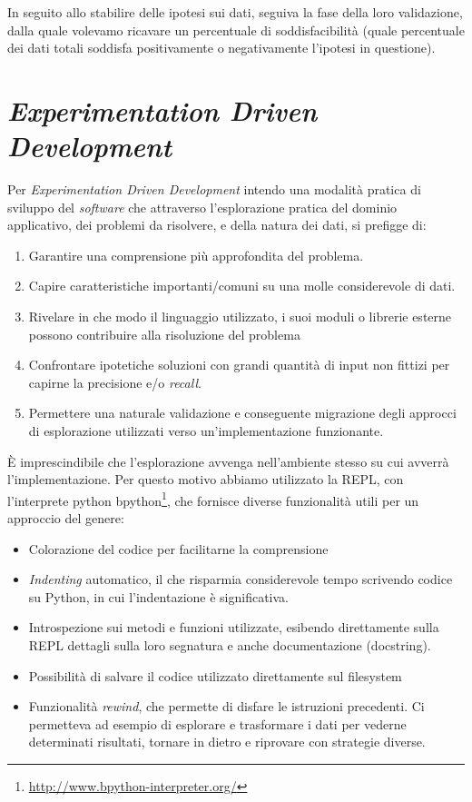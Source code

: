 \documentclass[12pt]{report}
\begin{document}
In seguito allo stabilire delle ipotesi sui dati, seguiva la fase della loro validazione, dalla quale volevamo ricavare un percentuale di soddisfacibilità (quale percentuale dei dati totali soddisfa positivamente o negativamente l'ipotesi in questione).

\section{\textit{Experimentation Driven Development}}

Per \textit{Experimentation Driven Development} intendo una modalità pratica di sviluppo del \textit{software} che attraverso l'esplorazione pratica del dominio applicativo, dei problemi da risolvere, e della natura dei dati, si prefigge di:

\begin{enumerate}
	\item Garantire una comprensione più approfondita del problema.
	\item Capire caratteristiche importanti/comuni su una molle considerevole di dati.
  \item Rivelare in che modo il linguaggio utilizzato, i suoi moduli o librerie esterne possono contribuire alla risoluzione del problema
  \item Confrontare ipotetiche soluzioni con grandi quantità di input non fittizi per capirne la precisione e/o \textit{recall}.
	\item Permettere una naturale validazione e conseguente migrazione degli approcci di esplorazione utilizzati verso un'implementazione funzionante.
\end{enumerate}

È imprescindibile che l'esplorazione avvenga nell'ambiente stesso su cui avverrà l'implementazione. Per questo motivo abbiamo utilizzato la REPL, con l'interprete python bpython\footnote{\url{http://www.bpython-interpreter.org/}}, che fornisce diverse funzionalità utili per un approccio del genere:

\begin{itemize}
  \item Colorazione del codice per facilitarne la comprensione
  \item \textit{Indenting} automatico, il che risparmia considerevole tempo scrivendo codice su Python, in cui l'indentazione è significativa.
  \item Introspezione sui metodi e funzioni utilizzate, esibendo direttamente sulla REPL dettagli sulla loro segnatura e anche documentazione (docstring).
  \item Possibilità di salvare il codice utilizzato direttamente sul filesystem
  \item Funzionalità \textit{rewind}, che permette di disfare le istruzioni precedenti. Ci permetteva ad esempio di esplorare e trasformare i dati per vederne determinati risultati, tornare in dietro e riprovare con strategie diverse.
\end{itemize}
\end{document}
